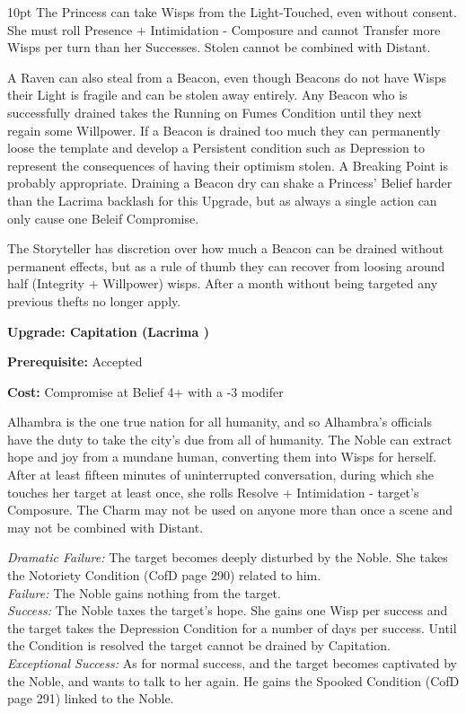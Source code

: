 \begin{myindentpar}{10pt}
The Princess can take Wisps from the Light-Touched, even without consent. She must roll Presence + Intimidation - Composure and cannot Transfer more Wisps per turn than her Successes. Stolen cannot be combined with Distant. 

A Raven can also steal from a Beacon, even though Beacons do not have Wisps their Light is fragile and can be stolen away entirely. Any Beacon who is successfully drained takes the Running on Fumes Condition until they next regain some Willpower. If a Beacon is drained too much they can permanently loose the template and develop a Persistent condition such as Depression to represent the consequences of having their optimism stolen. A Breaking Point is probably appropriate. Draining a Beacon dry can shake a Princess' Belief harder than the Lacrima backlash for this Upgrade, but as always a single action can only cause one Beleif Compromise. 

The Storyteller has discretion over how much a Beacon can be drained without permanent effects, but as a rule of thumb they can recover from loosing around  half (Integrity + Willpower) wisps. After a month without being targeted any previous thefts no longer apply. 

\textbf{Upgrade: Capitation (Lacrima \textbullet\textbullet\textbullet)}

\noindent \textbf{Prerequisite:} Accepted

\noindent \textbf{Cost:} Compromise at Belief 4+ with a -3 modifer

Alhambra is the one true nation for all humanity, and so Alhambra's officials have the duty to take the city's due from all of humanity. The Noble can extract hope and joy from a
mundane human, converting them into Wisps for herself. After at least fifteen minutes of uninterrupted conversation, during which she touches her target at least once, she rolls Resolve + Intimidation - target’s Composure. The Charm may not be used on anyone more than once a scene and may not be combined with Distant.

\emph{Dramatic Failure:} The target becomes deeply disturbed by the Noble. She takes the Notoriety Condition (CofD page 290) related to him.\\
\emph{Failure:} The Noble gains nothing from the target.\\
\emph{Success:} The Noble taxes the target’s hope. She gains one Wisp per success and the target takes the Depression Condition for a number of days per success. Until the Condition is resolved the target cannot be drained by Capitation.\\ 
\emph{Exceptional Success:} As for normal success, and the target becomes captivated by the Noble, and wants to talk to her again. He gains the Spooked Condition (CofD page 291) linked to the Noble.


\end{myindentpar}
